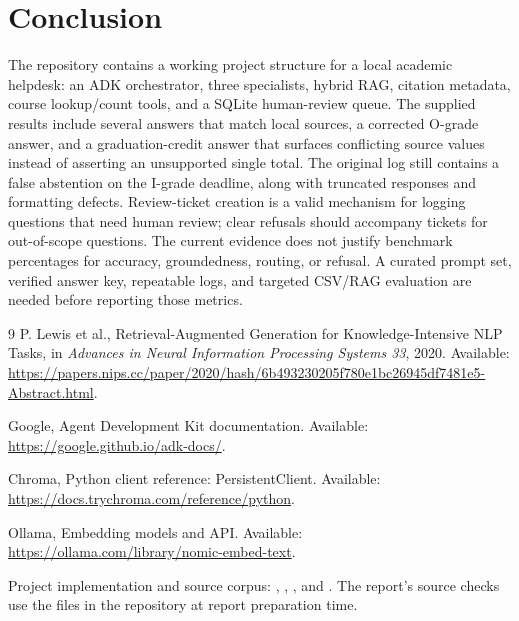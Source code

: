 \documentclass[11pt,a4paper]{article}
\begin{document}
\section{Conclusion}
The repository contains a working project structure for a local academic helpdesk: an ADK orchestrator, three specialists, hybrid RAG, citation metadata, course lookup/count tools, and a SQLite human-review queue. The supplied results include several answers that match local sources, a corrected O-grade answer, and a graduation-credit answer that surfaces conflicting source values instead of asserting an unsupported single total. The original log still contains a false abstention on the I-grade deadline, along with truncated responses and formatting defects. Review-ticket creation is a valid mechanism for logging questions that need human review; clear refusals should accompany tickets for out-of-scope questions. The current evidence does not justify benchmark percentages for accuracy, groundedness, routing, or refusal. A curated prompt set, verified answer key, repeatable logs, and targeted CSV/RAG evaluation are needed before reporting those metrics.

\begin{thebibliography}{9}
P. Lewis et al., Retrieval-Augmented Generation for Knowledge-Intensive NLP Tasks, in \emph{Advances in Neural Information Processing Systems 33}, 2020. Available: \url{https://papers.nips.cc/paper/2020/hash/6b493230205f780e1bc26945df7481e5-Abstract.html}.

Google, Agent Development Kit documentation. Available: \url{https://google.github.io/adk-docs/}.

Chroma, Python client reference: PersistentClient. Available: \url{https://docs.trychroma.com/reference/python}.

Ollama, Embedding models and API. Available: \url{https://ollama.com/library/nomic-embed-text}.

Project implementation and source corpus: , , , and . The report's source checks use the files in the repository at report preparation time.
\end{thebibliography}
\end{document}
